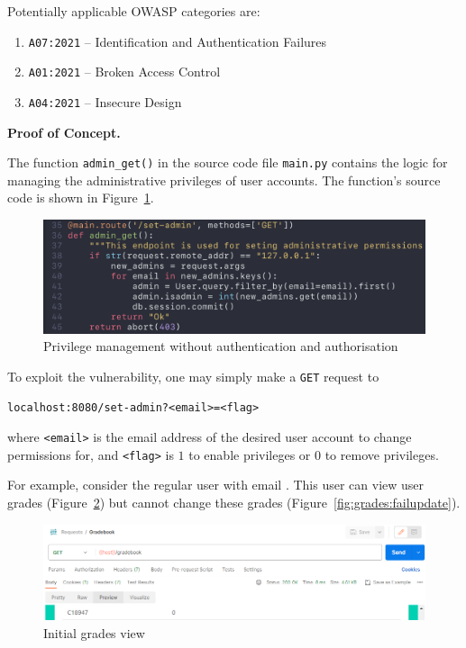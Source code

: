 \documentclass[parskip=half]{scrartcl}
\newcommand{\figref}[1]{Figure~\ref{#1}}
\begin{document}
Potentially applicable OWASP categories are:
\begin{enumerate}
  \item \texttt{A07:2021} -- Identification and Authentication Failures%
  \item \texttt{A01:2021} -- Broken Access Control%
  \item \texttt{A04:2021} -- Insecure Design%
\end{enumerate}

\textbf{Proof of Concept.}

The function \texttt{admin\_get()} in the source code file \texttt{main.py}
contains the logic for managing the administrative privileges of user accounts.
The function's source code is shown in \figref{fig:code:adminset}.

\begin{figure}[h]
    \centering
    \includegraphics[width=\textwidth]{code_adminset}
    \caption{Privilege management without authentication and authorisation}
    \label{fig:code:adminset}
\end{figure}

To exploit the vulnerability, one may simply make a \texttt{GET} request to
\begin{verbatim}
localhost:8080/set-admin?<email>=<flag>
\end{verbatim}
where \texttt{<email>} is the email address of the desired user account to
change permissions for, and \texttt{<flag>} is $1$ to enable privileges or $0$
to remove privileges.

For example, consider the regular user with email \texttt{\email}. This user
can view user grades (\figref{fig:grades:view}) but cannot change these
grades (\figref{fig:grades:failupdate}).

\begin{figure}[h]
    \centering
    \includegraphics[width=\textwidth]{view_grade}
    \caption{Initial grades view}
    \label{fig:grades:view}
\end{figure}
\end{document}
